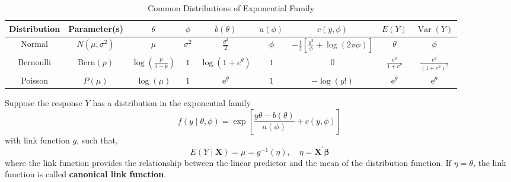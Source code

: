 \begin{landscape}
    \begin{table}[hpt]
        \centering
        \caption{Common Distributions of Exponential Family}
        \begin{tabular}{ccccccccc}
            \toprule
            Distribution & Parameter(s)      & $\theta$                         & $\phi$       & $b(\theta)$                     & $a(\phi)$ & $c(y,\phi)$                                                   & $E(Y)$                            & $\operatorname{Var}(Y)$                            \\
            \midrule
            Normal       & $N(\mu,\sigma^2)$ & $\mu$                            & $\sigma^{2}$ & $\frac{\theta^{2}}{2}$          & $\phi$    & $-\frac{1}{2}\left[\frac{y^{2}}{\phi}+\log (2\pi\phi)\right]$ & $\theta$                          & $\phi$                                             \\
            Bernoulli    & $\text{Bern}(p)$  & $\log\left(\frac{p}{1-p}\right)$ & $1$          & $\log\left(1+e^{\theta}\right)$ & $1$       & $0$                                                           & $\frac{e^{\theta}}{1+e^{\theta}}$ & $\frac{e^{\theta}}{\left(1+e^{\theta}\right)^{2}}$ \\
            Poisson      & $P(\mu)$          & $\log(\mu)$                      & $1$          & $\mathrm{e}^{\theta}$           & $1$       & $-\log(y!)$                                                   & $\mathrm{e}^{\theta}$             & $\mathrm{e}^{\theta}$                              \\
            \bottomrule
        \end{tabular}
    \end{table}
\end{landscape}

Suppose the response $Y$ has a distribution in the exponential family
\begin{equation*}
    f\left(y\mid\theta,\phi\right)=\exp\left[\frac{y\theta-b(\theta)}{a(\phi)}+c(y,\phi)\right]
\end{equation*}
with link function $g$, such that,
\begin{equation}
    E\left(Y\mid\mathbf{X}\right)=\mu=g^{-1}(\eta),\quad\eta=\mathbf{X}^{\prime}\boldsymbol{\beta}
\end{equation}
where the link function provides the relationship between the linear predictor and the mean of the distribution function. If $\eta=\theta$, the link function is called \textbf{canonical link function}.

